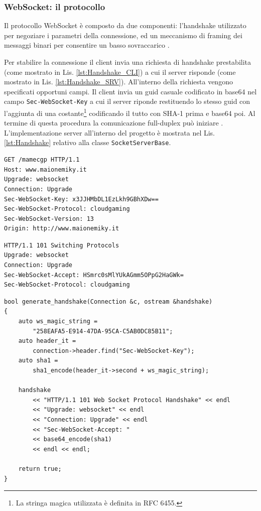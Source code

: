 \subsubsection{WebSocket: il protocollo}
Il protocollo WebSocket è composto da due componenti: l'handshake utilizzato per negoziare i parametri della connessione, ed un meccanismo di framing dei messaggi binari per consentire un basso sovraccarico \parencite{High_Performance_Browser_Networking}.

Per stabilire la connessione il client invia una richiesta di handshake prestabilita (come mostrato in Lis. \ref{lst:Handshake_CLI}) a cui il server risponde (come mostrato in Lis. \ref{lst:Handshake_SRV}). All'interno della richiesta vengono specificati opportuni campi. Il client invia un guid casuale codificato in base64 nel campo \verb|Sec-WebSocket-Key| a cui il server riponde restituendo lo stesso guid con l'aggiunta di una costante\footnote{La stringa magica utilizzata è definita in RFC 6455.} codificando il tutto con SHA-1 prima e base64 poi. Al termine di questa procedura la comunicazione full-duplex può iniziare \parencite{Writing_WebSocket_servers}. L'implementazione server all'interno del progetto è mostrata nel Lis. \ref{lst:Handshake} relativo alla classe \verb|SocketServerBase|.

\begin{lstlisting}[language=HTML, caption=Richiesta handshake da parte del client, label={lst:Handshake_CLI}]
GET /mamecgp HTTP/1.1
Host: www.maionemiky.it
Upgrade: websocket
Connection: Upgrade
Sec-WebSocket-Key: x3JJHMbDL1EzLkh9GBhXDw==	
Sec-WebSocket-Protocol: cloudgaming
Sec-WebSocket-Version: 13
Origin: http://www.maionemiky.it
\end{lstlisting}

\begin{lstlisting}[language=HTML, caption=Risposta handshake da parte del server, label={lst:Handshake_SRV}]
HTTP/1.1 101 Switching Protocols
Upgrade: websocket
Connection: Upgrade
Sec-WebSocket-Accept: HSmrc0sMlYUkAGmm5OPpG2HaGWk=
Sec-WebSocket-Protocol: cloudgaming
\end{lstlisting}

\begin{lstlisting}[caption=Codice per handshake implementato in SocketServerBase. File: \detokenize{lib/util/server_ws_impl.hpp}, label={lst:Handshake}]
bool generate_handshake(Connection &c, ostream &handshake)
{
	auto ws_magic_string =
		"258EAFA5-E914-47DA-95CA-C5AB0DC85B11";
	auto header_it = 
		connection->header.find("Sec-WebSocket-Key");	
	auto sha1 =
		sha1_encode(header_it->second + ws_magic_string);

	handshake
		<< "HTTP/1.1 101 Web Socket Protocol Handshake" << endl
		<< "Upgrade: websocket" << endl
		<< "Connection: Upgrade" << endl
		<< "Sec-WebSocket-Accept: "
		<< base64_encode(sha1)			
		<< endl << endl;

	return true;
}
\end{lstlisting}

